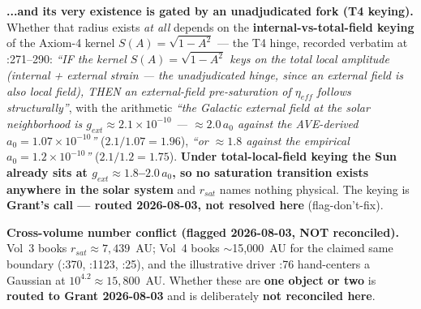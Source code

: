 \noindent\textbf{...and its very existence is gated by an unadjudicated fork
(T4 keying).}  Whether that radius exists \emph{at all} depends on the
\textbf{internal-vs-total-field keying} of the Axiom-4 kernel $S(A) =
\sqrt{1-A^2}$ --- the T4 hinge, recorded verbatim at
:271--290:
\emph{``IF the kernel $S(A)=\sqrt{1-A^2}$ keys on the total local amplitude
(internal + external strain --- the unadjudicated hinge, since an external
field is also local field), THEN an external-field pre-saturation of
$\eta_{eff}$ follows structurally''}, with the arithmetic \emph{``the Galactic
external field at the solar neighborhood is $g_{ext} \approx
2.1\times10^{-10}$ --- $\approx 2.0\,a_0$ against the AVE-derived $a_0 =
1.07\times10^{-10}$''} ($2.1/1.07 = 1.96$), \emph{``or $\approx 1.8$ against
the empirical $a_0 = 1.2\times10^{-10}$''} ($2.1/1.2 = 1.75$).
\textbf{Under total-local-field keying the Sun already sits at
$g_{ext} \approx 1.8$--$2.0\,a_0$, so no saturation transition exists anywhere
in the solar system} and $r_{sat}$ names nothing physical.  The keying is
\textbf{Grant's call --- routed 2026-08-03, not resolved here}
(flag-don't-fix).

\noindent\textbf{Cross-volume number conflict (flagged 2026-08-03, NOT
reconciled).}  Vol~3 books $r_{sat} \approx 7{,}439$~AU; Vol~4 books
$\sim$15,000~AU for the claimed same boundary
(:370,
:1123,
:25),
and the illustrative driver
:76
hand-centers a Gaussian at $10^{4.2} \approx 15{,}800$~AU.  Whether these are
\textbf{one object or two} is \textbf{routed to Grant 2026-08-03} and is
deliberately \textbf{not reconciled here}.


